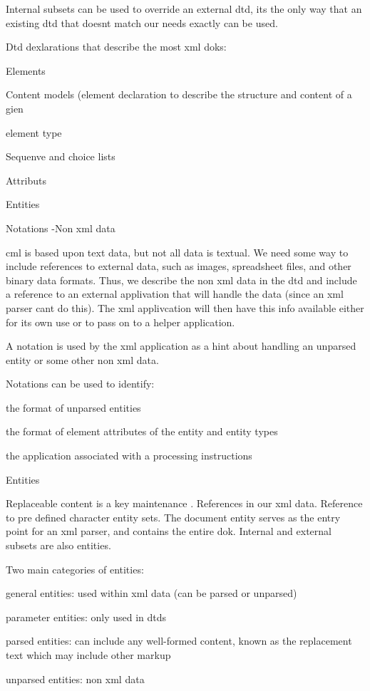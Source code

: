 Internal subsets can be used to override an external dtd, its the only way that an existing dtd that doesnt match our needs exactly can be used.

Dtd dexlarations that describe the most xml doks:

Elements

Content models (element declaration to describe the structure and content of a gien

element type

Sequenve and choice lists

Attributs

Entities

Notations -Non xml data

cml is based upon text data, but not all data is textual. We need some way to include references to external data, such as images, spreadsheet files, and other binary data formats. Thus, we describe the non xml data in the dtd and include a reference to an external applivation that will handle the data (since an xml parser cant do this). The xml applivcation will then have this info available either for its own use or to pass on to a helper application.

A notation is used by the xml application as a hint about handling an unparsed entity or some other non xml data. 

Notations can be used to identify:

the format of unparsed entities

the format of element attributes of the entity and entity types

the application associated with a processing instructions

Entities

Replaceable content is a key maintenance . References in our xml data. Reference to pre defined character entity sets. The document entity serves as the entry point for an xml parser, and contains the entire dok. Internal and external subsets are also entities.

Two main categories of entities:

general entities: used within xml data (can be parsed or unparsed)

parameter entities: only used in dtds



parsed entities: can include any well-formed content, known  as the replacement text which may include other markup

unparsed entities: non xml data

